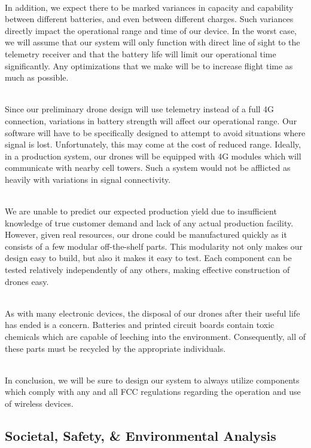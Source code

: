 \documentclass[12pt]{extarticle}
\begin{document}
\ \\
In addition, we expect there to be marked variances in capacity and capability between different batteries, and even between different charges.  Such variances directly impact the operational range and time of our device.  In the worst case, we will assume that our system will only function with direct line of sight to the telemetry receiver and that the battery life will limit our operational time significantly.  Any optimizations that we make will be to increase flight time as much as possible.   

\ \\
Since our preliminary drone design will use telemetry instead of a full 4G connection, variations in battery strength will affect our operational range.  Our software will have to be specifically designed to attempt to avoid situations where signal is lost.  Unfortunately, this may come at the cost of reduced range.  Ideally, in a production system, our drones will be equipped with 4G modules which will communicate with nearby cell towers.  Such a system would not be afflicted as heavily with variations in signal connectivity.

\ \\
We are unable to predict our expected production yield due to insufficient knowledge of true customer demand and lack of any actual production facility.  However, given real resources, our drone could be manufactured quickly as it consists of a few modular off-the-shelf parts.  This modularity not only makes our design easy to build, but also it makes it easy to test.  Each component can be tested relatively independently of any others, making effective construction of drones easy.  

\ \\
As with many electronic devices, the disposal of our drones after their useful life has ended is a concern.  Batteries and printed circuit boards contain toxic chemicals which are capable of leeching into the environment.  Consequently, all of these parts must be recycled by the appropriate individuals.  

\ \\
In conclusion, we will be sure to design our system to always utilize components which comply with any and all FCC regulations regarding the operation and use of wireless devices.  


\subsection{Societal, Safety, \& Environmental Analysis}
\end{document}
